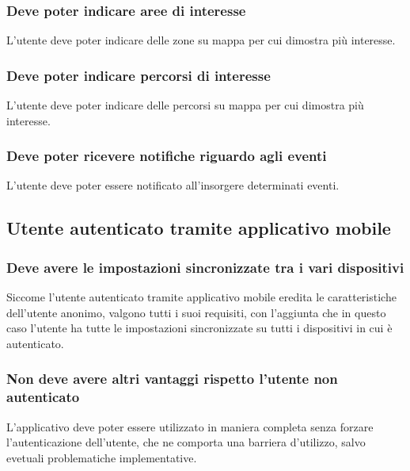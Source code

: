 \documentclass{article}
\begin{document}
\subsubsection{Deve poter indicare aree di interesse}
L'utente deve poter indicare delle zone su mappa per cui dimostra più interesse.

\subsubsection{Deve poter indicare percorsi di interesse}
L'utente deve poter indicare delle percorsi su mappa per cui dimostra più interesse.

\subsubsection{Deve poter ricevere notifiche riguardo agli eventi}
L'utente deve poter essere notificato all'insorgere determinati eventi.

\subsection{Utente autenticato tramite applicativo mobile}

\subsubsection{Deve avere le impostazioni sincronizzate tra i vari dispositivi}
Siccome l'utente autenticato tramite applicativo mobile eredita le caratteristiche dell'utente anonimo, valgono tutti i suoi requisiti, con l'aggiunta che in questo caso l'utente ha tutte le impostazioni sincronizzate su tutti i dispositivi in cui è autenticato.

\subsubsection{Non deve avere altri vantaggi rispetto l'utente non autenticato}
L'applicativo deve poter essere utilizzato in maniera completa senza forzare l'autenticazione dell'utente, che ne comporta una barriera d'utilizzo, salvo evetuali problematiche implementative.
\end{document}
